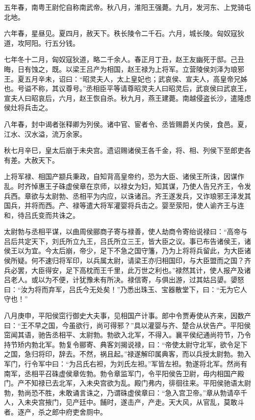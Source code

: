 \documentclass[12pt,UTF8]{ctexbook}
\begin{document}
五年春，南粤王尉佗自称南武帝。秋八月，淮阳王强薨。九月，发河东、上党骑屯北地。



六年春，星昼见。夏四月，赦天下。秩长陵令二千石。六月，城长陵。匈奴寇狄道，攻阿阳。行五分钱。



七年冬十二月，匈奴寇狄道，略二千余人。春正月丁丑，赵王友幽死于邸。己丑晦，日有蚀之，既。以梁王吕产为相国，赵王禄为上将军。立营陵侯刘泽为琅邪王。夏五月辛未，诏曰：“昭灵夫人，太上皇妃也；武哀侯、宣夫人，高皇帝兄姊也。号谥不称，其议尊号。”丞相臣平等请尊昭灵夫人曰昭灵后，武哀侯曰武哀王，宣夫人曰昭哀后，六月，赵王恢自杀。秋九月，燕王建薨。南越侵盗长沙，遣隆虑侯灶将兵击之。



八年春，封中谒者张释卿为列侯。诸中官、宦者令、丞皆赐爵关内侯，食邑。夏，江水、汉水溢，流万余家。



秋七月辛巳，皇太后崩于未央宫。遗诏赐诸侯王各千金，将、相、列侯下至郎吏各有差。大赦天下。



上将军禄、相国产颛兵秉政，自知背高皇帝约，恐为大臣、诸侯王所诛，因谋作乱。时齐悼惠王子硃虚侯章在京师，以禄女为妇，知其谋，乃使人告兄齐王，令发兵西。章欲与太尉勃、丞相平为内应，以诛诸吕。齐王遂发兵，又诈琅邪王泽发其国兵，并将而西。产、禄等遣大将军灌婴将兵击之。婴至荥阳，使人谕齐王与连和，待吕氏变而共诛之。



太尉勃与丞相平谋，以曲周侯郦商子寄与禄善，使人劫商令寄绐说禄曰：“高帝与吕后共定天下，刘氏所立九王，吕氏所立三王，皆大臣之议。事已布告诸侯王，诸侯王以为宜。今太后崩，帝少，足下不急之国守籓，乃为上将将兵留此，为大臣诸侯所疑。何不速归将军印，以兵属太尉，请梁王亦归相国印，与大臣盟而之国？齐兵必罢，大臣得安，足下高枕而王千里，此万世之利也。”禄然其计，使人报产及诸吕老人。或以为不便，计犹豫未有所决。禄信寄，与俱出游，过其姑吕嬃。嬃怒曰：“汝为将而弃军，吕氏今无处矣！”乃悉出珠玉、宝器散堂下，曰：“无为它人守也！”



八月庚申，平阳侯窋行御史大夫事，见相国产计事。郎中令贾寿使从齐来，因数产曰：“王不早之国，今虽欲行，尚可得邪？”具以灌婴与齐、楚合从状告产。平阳侯窋闻其语，驰告丞相平、太尉勃。勃欲入北军，不得入。襄平侯纪通尚符节，乃令持节矫内勃北军。勃复令郦寄、典客刘揭说禄，曰：“帝使太尉守北军，欲令足下之国，急归将印，辞去。不然，祸且起。”禄遂解印属典客，而以兵授太尉勃。勃入军门，行令军中曰：“为吕氏右袒，为刘氏左袒。”军皆左袒。勃遂将北军。然尚有南军，丞相平召硃虚侯章佐勃。勃令章监军门，令平阳侯告卫尉，毋内相国产殿门。产不知禄已去北军，入未央宫欲为乱。殿门弗内，徘徊往来。平阳侯驰语太尉勃，勃尚恐不胜，未敢诵言诛之，乃谓硃虚侯章曰：“急入宫卫帝。”章从勃请卒千人，入未央宫掖门，见产廷中。餔时，遂击产，产走。天大风，从官乱，莫敢斗者。逐产，杀之郎中府吏舍厕中。
\end{document}

